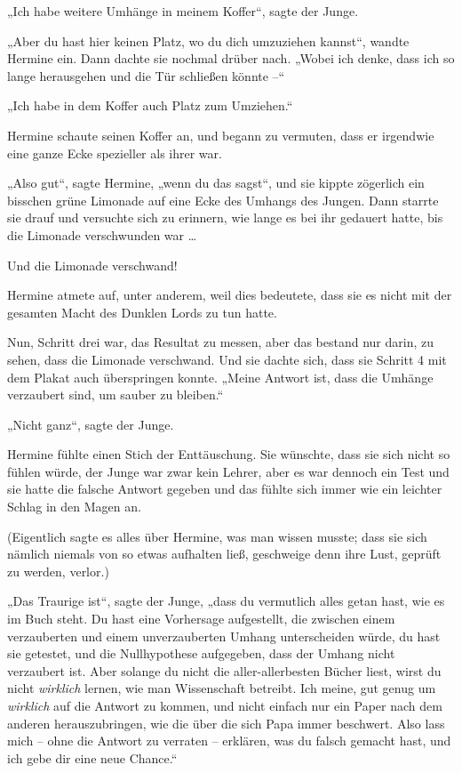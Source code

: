 {„Ich habe weitere Umhänge in meinem Koffer“, sagte der Junge.

„Aber du hast hier keinen Platz, wo du dich umzuziehen kannst“, wandte Hermine ein. Dann dachte sie nochmal drüber nach. „Wobei ich denke, dass ich so lange herausgehen und die Tür schließen könnte --“

„Ich habe in dem Koffer auch Platz zum Umziehen.“

Hermine schaute seinen Koffer an, und begann zu vermuten, dass er irgendwie eine ganze Ecke spezieller als ihrer war.

„Also gut“, sagte Hermine, „wenn du das sagst“, und sie kippte zögerlich ein bisschen grüne Limonade auf eine Ecke des Umhangs des Jungen. Dann starrte sie drauf und versuchte sich zu erinnern, wie lange es bei ihr gedauert hatte, bis die Limonade verschwunden war …

Und die Limonade verschwand!

Hermine atmete auf, unter anderem, weil dies bedeutete, dass sie es nicht mit der gesamten Macht des Dunklen Lords zu tun hatte.

Nun, Schritt drei war, das Resultat zu messen, aber das bestand nur darin, zu sehen, dass die Limonade verschwand. Und sie dachte sich, dass sie Schritt 4 mit dem Plakat auch überspringen konnte. „Meine Antwort ist, dass die Umhänge verzaubert sind, um sauber zu bleiben.“

„Nicht ganz“, sagte der Junge.

Hermine fühlte einen Stich der Enttäuschung. Sie wünschte, dass sie sich nicht so fühlen würde, der Junge war zwar kein Lehrer, aber es war dennoch ein Test und sie hatte die falsche Antwort gegeben und das fühlte sich immer wie ein leichter Schlag in den Magen an.

(Eigentlich sagte es alles über Hermine, was man wissen musste; dass sie sich nämlich niemals von so etwas aufhalten ließ, geschweige denn ihre Lust, geprüft zu werden, verlor.)

„Das Traurige ist“, sagte der Junge, „dass du vermutlich alles getan hast, wie es im Buch steht. Du hast eine Vorhersage aufgestellt, die zwischen einem verzauberten und einem unverzauberten Umhang unterscheiden würde, du hast sie getestet, und die Nullhypothese aufgegeben, dass der Umhang nicht verzaubert ist. Aber solange du nicht die aller-allerbesten Bücher liest, wirst du nicht \emph{wirklich} lernen, wie man Wissenschaft betreibt. Ich meine, gut genug um \emph{wirklich} auf die Antwort zu kommen, und nicht einfach nur ein Paper nach dem anderen herauszubringen, wie die über die sich Papa immer beschwert. Also lass mich -- ohne die Antwort zu verraten -- erklären, was du falsch gemacht hast, und ich gebe dir eine neue Chance.“

}
